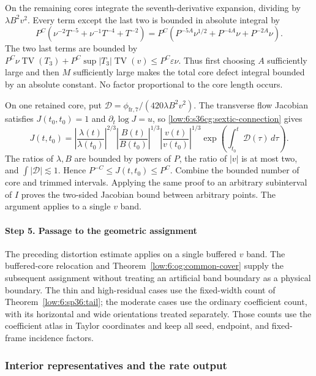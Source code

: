 \documentclass[11pt]{amsart}
\theoremstyle{definition}
\theoremstyle{remark}
\numberwithin{equation}{section}
\begin{document}
On the remaining cores integrate the seventh-derivative expansion, dividing by $\lambda B^2v^2$. Every term except the last two is bounded in absolute integral by
\[
P^C\left(\nu^{-2}T^{-5}+\nu^{-1}T^{-4}+T^{-2}\right)
=P^C\left(P^{-5A}\nu^{1/2}+P^{-4A}\nu+P^{-2A}\nu\right).
\]
The two last terms are bounded by $P^C\nu\operatorname{TV}(T_3)+P^C\sup|T_3|\operatorname{TV}(v)\le P^C\varepsilon\nu$. Thus first choosing $A$ sufficiently large and then $M$ sufficiently large makes the total core defect integral bounded by an absolute constant. No factor proportional to the core length occurs.

On one retained core, put $\mathcal D=\phi_{\mathrm{fr},7}/(420\lambda B^2v^2)$. The transverse flow Jacobian satisfies $J(t_0,t_0)=1$ and $\partial_t\log J=u$, so \eqref{low:6:s36cg:sextic-connection} gives
\[
J(t,t_0)=\left|\frac{\lambda(t)}{\lambda(t_0)}\right|^{2/3}\left|\frac{B(t)}{B(t_0)}\right|^{1/3}\left|\frac{v(t)}{v(t_0)}\right|^{1/3}\exp\left(\int_{t_0}^{t}\mathcal D(\tau)\,d\tau\right).
\]
The ratios of $\lambda,B$ are bounded by powers of $P$, the ratio of $|v|$ is at most two, and $\int|\mathcal D|\lesssim1$. Hence $P^{-C}\le J(t,t_0)\le P^C$. Combine the bounded number of core and trimmed intervals. Applying the same proof to an arbitrary subinterval of $I$ proves the two-sided Jacobian bound between arbitrary points. The argument applies to a single $v$ band.

\paragraph{Step 5. Passage to the geometric assignment}

The preceding distortion estimate applies on a single buffered $v$ band. The buffered-core relocation and Theorem~\ref{low:6:og:common-cover} supply the subsequent assignment without treating an artificial band boundary as a physical boundary. The thin and high-residual cases use the fixed-width count of Theorem~\ref{low:6:sp36:tail}; the moderate cases use the ordinary coefficient count, with its horizontal and wide orientations treated separately. Those counts use the coefficient atlas in Taylor coordinates and keep all seed, endpoint, and fixed-frame incidence factors. 

\subsubsection{Interior representatives and the rate output}
\end{document}
